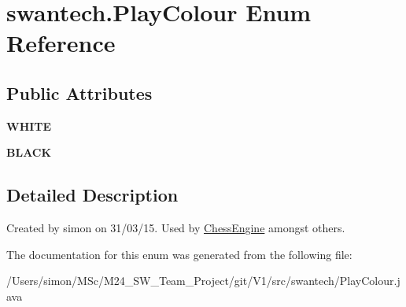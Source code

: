 \hypertarget{enumswantech_1_1_play_colour}{}\section{swantech.\+Play\+Colour Enum Reference}
\label{enumswantech_1_1_play_colour}
\subsection*{Public Attributes}
\begin{DoxyCompactItemize}
\item 
\hypertarget{enumswantech_1_1_play_colour_ad1f66414cb0f5de08aa973c29c695144}{}{\bfseries W\+H\+I\+T\+E}\label{enumswantech_1_1_play_colour_ad1f66414cb0f5de08aa973c29c695144}

\item 
\hypertarget{enumswantech_1_1_play_colour_ae0ea6d1df50fef598e3fecd90873ba35}{}{\bfseries B\+L\+A\+C\+K}\label{enumswantech_1_1_play_colour_ae0ea6d1df50fef598e3fecd90873ba35}

\end{DoxyCompactItemize}


\subsection{Detailed Description}
Created by simon on 31/03/15. Used by \hyperlink{classswantech_1_1_chess_engine}{Chess\+Engine} amongst others. 

The documentation for this enum was generated from the following file\+:\begin{DoxyCompactItemize}
\item 
/\+Users/simon/\+M\+Sc/\+M24\+\_\+\+S\+W\+\_\+\+Team\+\_\+\+Project/git/\+V1/src/swantech/Play\+Colour.\+java\end{DoxyCompactItemize}
